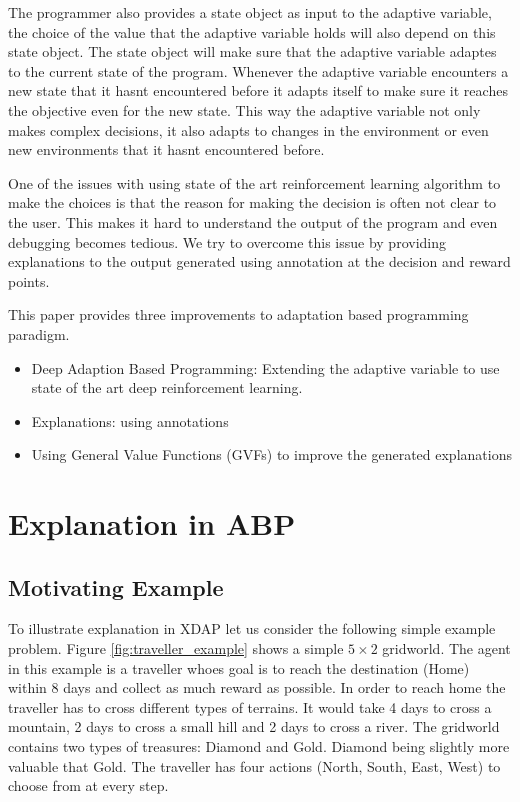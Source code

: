 \documentclass[conference]{IEEEtran}
\begin{document}
The programmer also provides a state %
object as input to the adaptive variable, the choice of the value
that the adaptive variable holds will also depend on this state object. The state object will make sure
that the adaptive variable adaptes to the current state of the program. Whenever the adaptive variable
encounters a new state that it hasnt encountered before it adapts itself to make sure it reaches
the objective even for the new state. This way the adaptive variable not only makes complex decisions,
it also adapts to changes in the environment or even new environments that it hasnt encountered before.

One of the issues with using state of the art reinforcement learning algorithm to make the choices
is that the reason for making the decision is often not clear to the user. This makes it hard to
understand the output of the program and even debugging becomes tedious. We try to overcome this
issue by providing explanations to the output generated using annotation at the decision and reward points.


This paper provides three improvements to adaptation based programming paradigm.
\begin{itemize}
  \item Deep Adaption Based Programming:
        Extending the adaptive variable to use state of the art deep reinforcement learning.
  \item Explanations: using annotations
  \item Using General Value Functions (GVFs) to improve the generated explanations
\end{itemize}



\section{Explanation in ABP} %


\subsection{Motivating Example}
To illustrate explanation in XDAP let us consider the following simple example problem. Figure \ref{fig:traveller_example}
shows a simple $5 \times 2$ gridworld. The agent in this example is a traveller whoes goal is to reach the destination (Home)
within 8 days and collect as much reward as possible. In order to reach home the traveller has to cross different
types of terrains. It would take 4 days to cross a mountain, 2 days to cross a small hill and 2 days to cross a river.
The gridworld contains two types of treasures: Diamond and Gold. Diamond being slightly more valuable that Gold.
The traveller has four actions (North, South, East, West) to choose from at every step.
\end{document}
